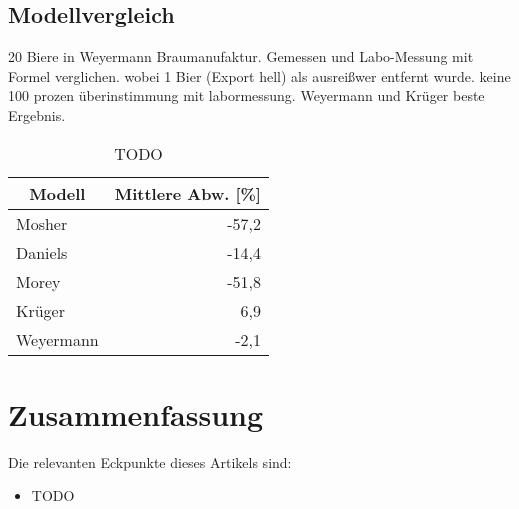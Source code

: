 \documentclass[a4paper,parskip=half]{scrartcl}
\begin{document}
\subsection*{Modellvergleich}

\parencite{KrausWeyermann2021b}
20 Biere in Weyermann Braumanufaktur. Gemessen und Labo-Messung mit Formel verglichen.
wobei 1 Bier (Export hell) als ausreißwer entfernt wurde.
keine 100 prozen überinstimmung mit labormessung.
Weyermann und Krüger beste Ergebnis.

\begin{table}[H]
\centering
\begin{tabular}{lr}
\toprule
\multicolumn{1}{c}{\textbf{Modell}} & \multicolumn{1}{c}{\textbf{Mittlere Abw. [\%]}} \\
\midrule
Mosher & -57,2 \\
Daniels & -14,4 \\
Morey & -51,8 \\
Krüger & 6,9 \\
Weyermann & -2,1 \\
\bottomrule
\end{tabular}
\caption{TODO \parencite{KrausWeyermann2021b}}
\label{table:modelcompare}
\end{table}


\section*{Zusammenfassung}


\parencite{Bruecklmeier2018}
\parencite{Holle2010}

\parencite{Smith2008}
\parencite{Bies2010}
\parencite{Tucker2017}

\parencite{KrausWeyermann2021a}
\parencite{KrausWeyermann2021b}
\parencite{KrausWeyermann2021c}

\parencite{Lange2016}
\parencite{Caro2019}
\parencite{Daniels2012}

Die relevanten Eckpunkte dieses Artikels sind:

\begin{itemize}
\item TODO
\end{itemize}

\printbibliography[title=Quellen]
\end{document}
